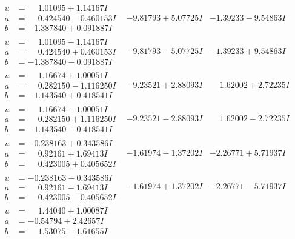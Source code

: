 \documentclass[1p]{elsarticle_modified}
\theoremstyle{definition}
\begin{document}
$$\begin{array}{c|c|c}
\begin{aligned}
u &= \phantom{-}1.01095 + 1.14167 I \\
a &= \phantom{-}0.424540 - 0.460153 I \\
b &= -1.387840 + 0.091887 I\end{aligned}
 & -9.81793 + 5.07725 I & -1.39233 - 9.54863 I \\ \hline\begin{aligned}
u &= \phantom{-}1.01095 - 1.14167 I \\
a &= \phantom{-}0.424540 + 0.460153 I \\
b &= -1.387840 - 0.091887 I\end{aligned}
 & -9.81793 - 5.07725 I & -1.39233 + 9.54863 I \\ \hline\begin{aligned}
u &= \phantom{-}1.16674 + 1.00051 I \\
a &= \phantom{-}0.282150 - 1.116250 I \\
b &= -1.143540 + 0.418541 I\end{aligned}
 & -9.23521 + 2.88093 I & \phantom{-}1.62002 + 2.72235 I \\ \hline\begin{aligned}
u &= \phantom{-}1.16674 - 1.00051 I \\
a &= \phantom{-}0.282150 + 1.116250 I \\
b &= -1.143540 - 0.418541 I\end{aligned}
 & -9.23521 - 2.88093 I & \phantom{-}1.62002 - 2.72235 I \\ \hline\begin{aligned}
u &= -0.238163 + 0.343586 I \\
a &= \phantom{-}0.92161 + 1.69413 I \\
b &= \phantom{-}0.423005 + 0.405652 I\end{aligned}
 & -1.61974 - 1.37202 I & -2.26771 + 5.71937 I \\ \hline\begin{aligned}
u &= -0.238163 - 0.343586 I \\
a &= \phantom{-}0.92161 - 1.69413 I \\
b &= \phantom{-}0.423005 - 0.405652 I\end{aligned}
 & -1.61974 + 1.37202 I & -2.26771 - 5.71937 I \\ \hline\begin{aligned}
u &= \phantom{-}1.44040 + 1.00087 I \\
a &= -0.54794 + 2.42657 I \\
b &= \phantom{-}1.53075 - 1.61655 I\end{aligned}

\end{array}$$
\end{document}
